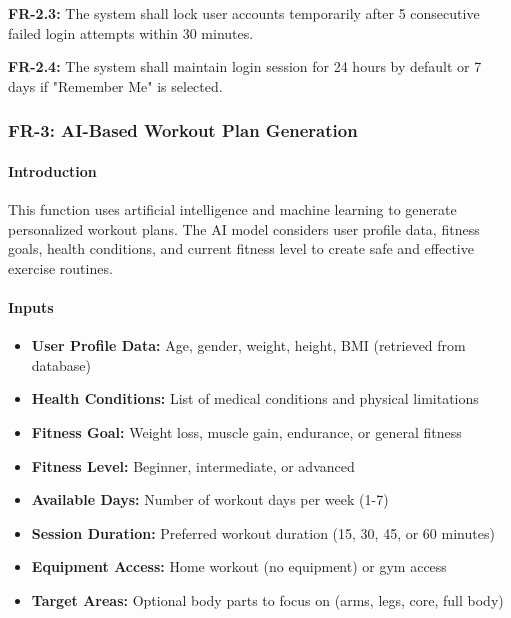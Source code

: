 \documentclass[12pt,a4paper]{article}
\begin{document}
\textbf{FR-2.3:} The system shall lock user accounts temporarily after 5 consecutive failed login attempts within 30 minutes.

\textbf{FR-2.4:} The system shall maintain login session for 24 hours by default or 7 days if "Remember Me" is selected.

\subsubsection{FR-3: AI-Based Workout Plan Generation}

\paragraph{Introduction}
This function uses artificial intelligence and machine learning to generate personalized workout plans. The AI model considers user profile data, fitness goals, health conditions, and current fitness level to create safe and effective exercise routines.

\paragraph{Inputs}
\begin{itemize}
    \item \textbf{User Profile Data:} Age, gender, weight, height, BMI (retrieved from database)
    \item \textbf{Health Conditions:} List of medical conditions and physical limitations
    \item \textbf{Fitness Goal:} Weight loss, muscle gain, endurance, or general fitness
    \item \textbf{Fitness Level:} Beginner, intermediate, or advanced
    \item \textbf{Available Days:} Number of workout days per week (1-7)
    \item \textbf{Session Duration:} Preferred workout duration (15, 30, 45, or 60 minutes)
    \item \textbf{Equipment Access:} Home workout (no equipment) or gym access
    \item \textbf{Target Areas:} Optional body parts to focus on (arms, legs, core, full body)
\end{itemize}
\end{document}

